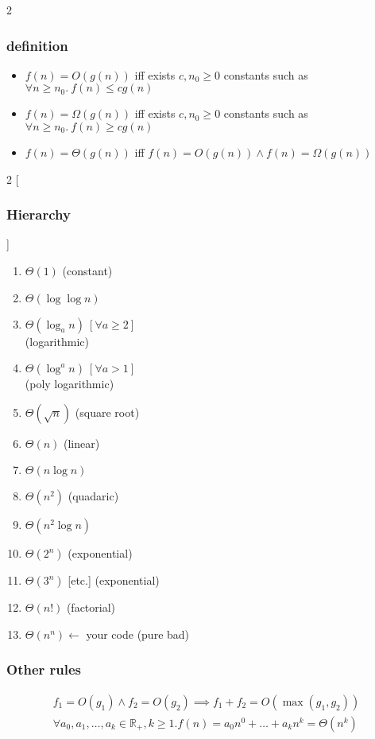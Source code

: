 \documentclass[]{article}
\newcommand\R     {\mathbb{R}}
\newcommand\logn  {\log n}
\begin{document}
\begin{multicols}{2}
		\subsubsection{definition}
		\begin{itemize}
			\item $ f(n) = O(g(n)) $ iff exists $ c, n_0 \ge 0 $ constants such as $ \forall n \ge n_0. \ f(n) \le c g(n) $
			\item $ f(n) = \Omega(g(n)) $ iff exists $ c, n_0 \ge 0 $ constants such as $ \forall n \ge n_0. \ f(n) \ge c g(n) $
			\item $ f(n) = \Theta(g(n)) $ iff $ f(n) = O(g(n)) \land f(n) = \Omega(g(n)) $
		\end{itemize}
		\begin{multicols}{2}
			[\subsubsection{Hierarchy}]
			\begin{enumerate}
				\item $ \Theta(1) $ (constant)
				\item $ \Theta(\log \logn) $ 
				\item $ \Theta(\log_a n) \ [\forall a \ge 2] $ \\ (logarithmic)
				\item $ \Theta(\log^a n) \ [\forall a > 1] $ \\ (poly logarithmic)
				\item $ \Theta(\sqrt{n}) $ (square root)
				\item $ \Theta(n) $ (linear)
				\item $ \Theta(n \log n) $
				\item $ \Theta(n^2) $ (quadaric)
				\item $ \Theta(n^2 \log n) $
				\item $ \Theta(2^n) $ (exponential)
				\item $ \Theta(3^n) $ [etc.] (exponential)
				\item $ \Theta(n!) $ (factorial)
				\item $ \Theta(n^n) \leftarrow $ your code (pure bad)
			\end{enumerate}
		\end{multicols}
		\subsubsection{Other rules}
		\begin{gather*}
			f_1 = O(g_1) \land f_2 = O(g_2) \implies f_1 + f_2 = O(\max(g_1, g_2)) \\
			\forall a_0, a_1, \dots, a_k \in \R_+, k \ge 1. f(n) = a_0n^0 + \dots + a_kn^k = \Theta(n^k)
		\end{gather*}
		

\end{multicols}
\end{document}
